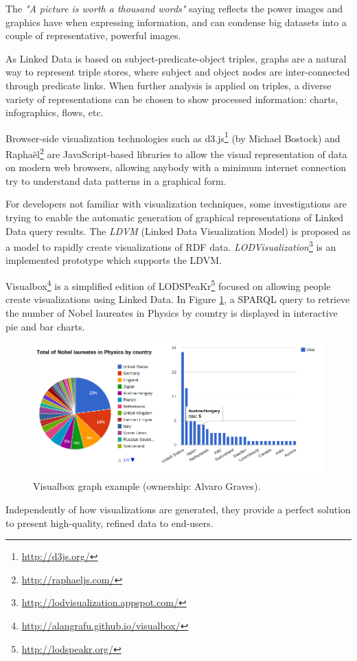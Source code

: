 The \textit{"A picture is worth a thousand words"} saying reflects the power images and graphics have when expressing information, and can condense big datasets into a couple of representative, powerful images.

As Linked Data is based on subject-predicate-object triples, graphs are a natural way to represent triple stores, where subject and object nodes are inter-connected through predicate links. When further analysis is applied on triples, a diverse variety of representations can be chosen to show processed information: charts, infographics, flows, etc.\cite{khan2011data}

Browser-side visualization technologies such as d3.js\footnote{\url{http://d3js.org/}} (by Michael Bostock) and Raphaël\footnote{\url{http://raphaeljs.com/}} are JavaScript-based libraries to allow the visual representation of data on modern web browsers, allowing anybody with a minimum internet connection try to understand data patterns in a graphical form.

For developers not familiar with visualization techniques, some investigations are trying to enable the automatic generation of graphical representations of Linked Data query results. The \textit{LDVM} (Linked Data Visualization Model) \cite{brunetti2012linked} is proposed as a model to rapidly create visualizations of RDF data. \textit{LODVisualization}\footnote{\url{http://lodvisualization.appspot.com/}} is an implemented prototype which supports the LDVM.

Visualbox\footnote{\url{http://alangrafu.github.io/visualbox/}} is a simplified edition of LODSPeaKr\footnote{\url{http://lodspeakr.org/}} focused on allowing people create visualizations using Linked Data. In Figure \ref{fig:visualbox}, a SPARQL query to retrieve the number of Nobel laureates in Physics by country is displayed in interactive pie and bar charts.

\begin{figure}
    \center
    \includegraphics[width=\textwidth]{img/ld_approach/graph.png}
    \caption{Visualbox graph example (ownership: Alvaro Graves).}
    \label{fig:visualbox}
\end{figure}

Independently of how visualizations are generated, they provide a perfect solution to present high-quality, refined data to end-users.

